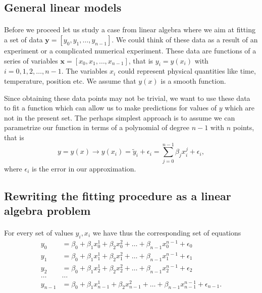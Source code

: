 \documentclass[%
oneside,                 %
final,                   %
10pt]{article}
\begin{document}
\subsection{General linear models}

\paragraph{}
Before we proceed let us study a case from linear algebra where we aim at fitting a set of data $\bm{y}=[y_0,y_1,\dots,y_{n-1}]$. We could think of these data as a result of an experiment or a complicated numerical experiment. These data are functions of a series of variables $\bm{x}=[x_0,x_1,\dots,x_{n-1}]$, that is $y_i = y(x_i)$ with $i=0,1,2,\dots,n-1$. The variables $x_i$ could represent physical quantities like time, temperature, position etc. We assume that $y(x)$ is a smooth function. 

Since obtaining these data points may not be trivial, we want to use these data to fit a function which can allow us to make predictions for values of $y$ which are not in the present set. The perhaps simplest approach is to assume we can parametrize our function in terms of a polynomial of degree $n-1$ with $n$ points, that is
\[
y=y(x) \rightarrow y(x_i)=\tilde{y}_i+\epsilon_i=\sum_{j=0}^{n-1} \beta_j x_i^j+\epsilon_i,
\]
where $\epsilon_i$ is the error in our approximation.




\subsection{Rewriting the fitting procedure as a linear algebra problem}

\paragraph{}
For every set of values $y_i,x_i$ we have thus the corresponding set of equations
\begin{align*}
y_0&=\beta_0+\beta_1x_0^1+\beta_2x_0^2+\dots+\beta_{n-1}x_0^{n-1}+\epsilon_0\\
y_1&=\beta_0+\beta_1x_1^1+\beta_2x_1^2+\dots+\beta_{n-1}x_1^{n-1}+\epsilon_1\\
y_2&=\beta_0+\beta_1x_2^1+\beta_2x_2^2+\dots+\beta_{n-1}x_2^{n-1}+\epsilon_2\\
\dots & \dots \\
y_{n-1}&=\beta_0+\beta_1x_{n-1}^1+\beta_2x_{n-1}^2+\dots+\beta_{n-1}x_{n-1}^{n-1}+\epsilon_{n-1}.\\
\end{align*}
\end{document}
